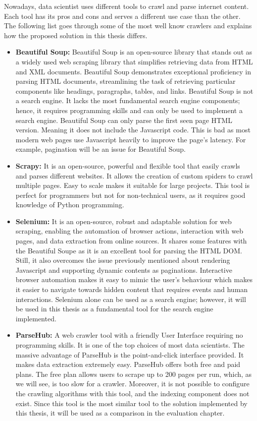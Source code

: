 Nowadays, data scientist uses different tools to crawl and parse internet content. Each tool has its pros and cons and serves a different use case than the other. The following list goes through some of the most well know crawlers and explains how the proposed solution in this thesis differs.  


\begin{itemize}
  \item \textbf{Beautiful Soup:} Beautiful Soup is an open-source library that stands out as a widely used web scraping library that simplifies retrieving data from HTML and XML documents. Beautiful Soup demonstrates exceptional proficiency in parsing HTML documents, streamlining the task of retrieving particular components like headings, paragraphs, tables, and links. Beautiful Soup is not a search engine. It lacks the most fundamental search engine components; hence, it requires programming skills and can only be used to implement a search engine. Beautiful Soup can only parse the first seen page HTML version. Meaning it does not include the Javascript code. This is bad as most modern web pages use Javascript heavily to improve the page's latency. For example, pagination will be an issue for Beautiful Soup.

  \item \textbf{Scrapy:} It is an open-source, powerful and flexible tool that easily crawls and parses different websites. It allows the creation of custom spiders to crawl multiple pages. Easy to scale makes it suitable for large projects. This tool is perfect for programmers but not for non-technical users, as it requires good knowledge of Python programming.

  \item \textbf{Selenium:} It is an open-source, robust and adaptable solution for web scraping, enabling the automation of browser actions, interaction with web pages, and data extraction from online sources. It shares some features with the Beautiful Soupe as it is an excellent tool for parsing the HTML DOM. Still, it also overcomes the issue previously mentioned about rendering Javascript and supporting dynamic contents as paginations. Interactive browser automation makes it easy to mimic the user's behaviour which makes it easier to navigate towards hidden content that requires events and human interactions. Selenium alone can be used as a search engine; however, it will be used in this thesis as a fundamental tool for the search engine implemented.    

  \item \textbf{ParseHub:} A web crawler tool with a friendly User Interface requiring no programming skills. It is one of the top choices of most data scientists. The massive advantage of ParseHub is the point-and-click interface provided. It makes data extraction extremely easy. ParseHub offers both free and paid plans. The free plan allows users to scrape up to 200 pages per run, which, as we will see, is too slow for a crawler. Moreover, it is not possible to configure the crawling algorithms with this tool, and the indexing component does not exist. Since this tool is the most similar tool to the solution implemented by this thesis, it will be used as a comparison in the evaluation chapter. 
\end{itemize}
